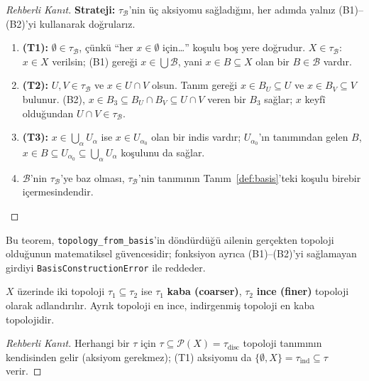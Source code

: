 \begin{proof}[Rehberli Kanıt]
\textbf{Strateji:} $\tau_{\mathcal{B}}$'nin üç aksiyomu sağladığını, her
adımda yalnız (B1)--(B2)'yi kullanarak doğrularız.
\begin{enumerate}
  \item \textbf{(T1):} $\emptyset\in\tau_{\mathcal B}$, çünkü ``her
        $x\in\emptyset$ için\ldots'' koşulu boş yere doğrudur.
        $X\in\tau_{\mathcal B}$: $x\in X$ verilsin; (B1) gereği
        $x\in\bigcup\mathcal B$, yani $x\in B\subseteq X$ olan bir
        $B\in\mathcal B$ vardır.
  \item \textbf{(T2):} $U,V\in\tau_{\mathcal B}$ ve $x\in U\cap V$
        olsun. Tanım gereği $x\in B_U\subseteq U$ ve
        $x\in B_V\subseteq V$ bulunur. (B2), $x\in B_3\subseteq
        B_U\cap B_V\subseteq U\cap V$ veren bir $B_3$ sağlar; $x$
        keyfî olduğundan $U\cap V\in\tau_{\mathcal B}$.
  \item \textbf{(T3):} $x\in\bigcup_\alpha U_\alpha$ ise
        $x\in U_{\alpha_0}$ olan bir indis vardır; $U_{\alpha_0}$'ın
        tanımından gelen $B$, $x\in B\subseteq
        U_{\alpha_0}\subseteq\bigcup_\alpha U_\alpha$ koşulunu da sağlar.
  \item $\mathcal B$'nin $\tau_{\mathcal B}$'ye baz olması,
        $\tau_{\mathcal B}$'nin tanımının Tanım~\ref{def:basis}'teki
        koşulu birebir içermesindendir.
\end{enumerate}
\end{proof}

\noindent Bu teorem, \texttt{topology\_from\_basis}'in döndürdüğü
ailenin gerçekten topoloji olduğunun matematiksel güvencesidir;
fonksiyon ayrıca (B1)--(B2)'yi sağlamayan girdiyi
\texttt{BasisConstructionError} ile reddeder.

\begin{theorem}[Karşılaştırma]
\label{thm:comparison}
$X$ üzerinde iki topoloji $\tau_1 \subseteq \tau_2$ ise $\tau_1$ \textbf{kaba (coarser)},
$\tau_2$ \textbf{ince (finer)} topoloji olarak adlandırılır. Ayrık topoloji en ince,
indirgenmiş topoloji en kaba topolojidir.
\end{theorem}

\begin{proof}[Rehberli Kanıt]
Herhangi bir $\tau$ için $\tau\subseteq\mathcal{P}(X)=\tau_{\mathrm{disc}}$
topoloji tanımının kendisinden gelir (aksiyom gerekmez); (T1) aksiyomu da
$\{\emptyset,X\}=\tau_{\mathrm{ind}}\subseteq\tau$ verir.
\end{proof}

